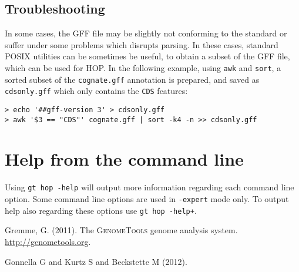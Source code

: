 \documentclass[12pt,titlepage]{article}
\newcommand{\Hop}{{HOP}\xspace}
\begin{document}
\subsection{Troubleshooting}

In some cases, the GFF file may be slightly not conforming to
the standard or suffer under some problems which disrupts parsing.
In these cases, standard POSIX utilities can be sometimes be
useful, to obtain a subset of the GFF file, which can be
used for \Hop. In the following example, using \texttt{awk} and
\texttt{sort}, a sorted subset of the \texttt{cognate.gff}
annotation is prepared, and saved as \texttt{cdsonly.gff} which
only contains the \texttt{CDS} features:

\begin{footnotesize}
\begin{verbatim}
> echo '##gff-version 3' > cdsonly.gff
> awk '$3 == "CDS"' cognate.gff | sort -k4 -n >> cdsonly.gff
\end{verbatim}
\end{footnotesize}

\section{Help from the command line}

Using \texttt{gt hop -help} will output more information regarding
each command line option. Some command line options are used in
\texttt{-expert} mode only. To output help also regarding these
options use \texttt{gt hop -help+}.

\begin{thebibliography}{1}

Gremme, G. (2011).
\newblock The \textsc{GenomeTools} genome analysis system.
  \url{http://genometools.org}.

Gonnella G and Kurtz S and Beckstette M (2012).

\end{thebibliography}
\end{document}
